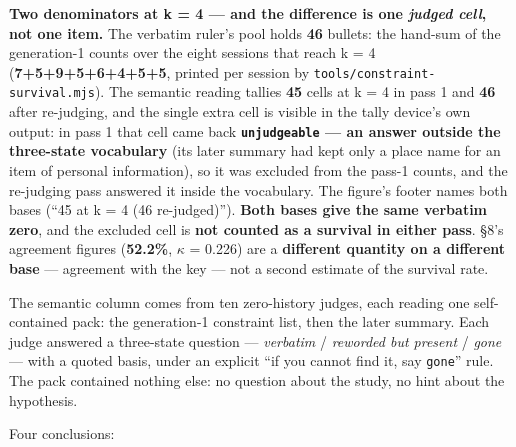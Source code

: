 \documentclass[
]{article}
\begin{document}
\textbf{Two denominators at k = 4 --- and the difference is one
\emph{judged cell}, not one item.} The verbatim ruler's pool holds
\textbf{46} bullets: the hand-sum of the generation-1 counts over the
eight sessions that reach k = 4 (\textbf{7+5+9+5+6+4+5+5}, printed per
session by \texttt{tools/constraint-survival.mjs}). The semantic reading
tallies \textbf{45} cells at k = 4 in pass 1 and \textbf{46} after
re-judging, and the single extra cell is visible in the tally device's
own output: in pass 1 that cell came back \textbf{\texttt{unjudgeable}
--- an answer outside the three-state vocabulary} (its later summary had
kept only a place name for an item of personal information), so it was
excluded from the pass-1 counts, and the re-judging pass answered it
inside the vocabulary. The figure's footer names both bases (``45 at k =
4 (46 re-judged)''). \textbf{Both bases give the same verbatim zero},
and the excluded cell is \textbf{not counted as a survival in either
pass}. §8's agreement figures (\textbf{52.2\%}, \ensuremath{\kappa} =
0.226) are a \textbf{different quantity on a different base} ---
agreement with the key --- not a second estimate of the survival rate.

The semantic column comes from ten zero-history judges, each reading one
self-contained pack: the generation-1 constraint list, then the later
summary. Each judge answered a three-state question --- \emph{verbatim}
/ \emph{reworded but present} / \emph{gone} --- with a quoted basis,
under an explicit ``if you cannot find it, say \texttt{gone}'' rule. The
pack contained nothing else: no question about the study, no hint about
the hypothesis.

Four conclusions:
\end{document}

